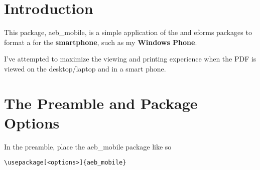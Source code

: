 \documentclass{article}
\begin{document}
\maketitle

\tableofcontents
{}

\section{Introduction}

This package, \textsf{aeb\_mobile}, is a simple application
of the {\Web} and \textsf{eforms} packages to format a {\PDF} for the
\textbf{smartphone}, such as my \textbf{Windows Phone}.

I've attempted to maximize the viewing and printing experience when the
PDF is viewed on the desktop/laptop and in a smart phone.

\section{The Preamble and Package Options}

In the preamble, place the \textsf{aeb\_mobile} package like so
\begin{Verbatim}[xleftmargin=20pt]
\usepackage[<options>]{aeb_mobile}
\end{Verbatim}
\end{document}
